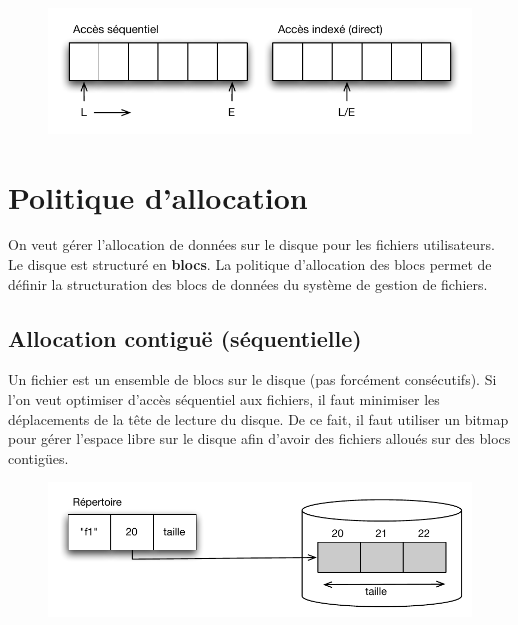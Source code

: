 \documentclass[11pt,english,french]{scrreprt}
\theoremstyle{remark}
\theoremstyle{definition}
\begin{document}
\begin{figure}[h!]
	\center
	\vspace{-15pt}
	\includegraphics[scale=.85]{img/acces-fichier}
	\vspace{-15pt}
\end{figure}

\section{Politique d'allocation}

On veut gérer l'allocation de données sur le disque pour les fichiers utilisateurs. Le disque est structuré en \textbf{blocs}. La politique d'allocation des blocs permet de définir la structuration des blocs de données du système de gestion de fichiers.

\subsection{Allocation contiguë (séquentielle)}
Un fichier est un ensemble de blocs sur le disque (pas forcément consécutifs). Si l'on veut optimiser d'accès séquentiel aux fichiers, il faut minimiser les déplacements de la tête de lecture du disque. De ce fait, il faut utiliser un bitmap pour gérer l'espace libre sur le disque afin d'avoir des fichiers alloués sur des blocs contigües.

\begin{figure}[h!]
	\center
	\vspace{-10pt}
	\includegraphics[scale=.75]{img/allocation-contigue}
	\vspace{-10pt}
\end{figure}
\end{document}
